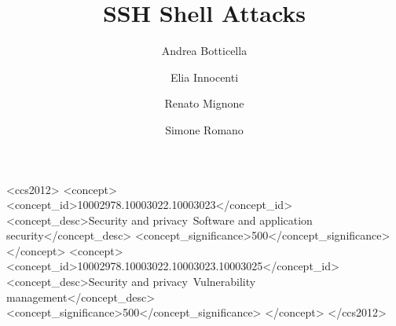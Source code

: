 \documentclass[acmlarge]{template/column-format-template/acmart}
\begin{document}
\title{SSH Shell Attacks}


\author{Andrea Botticella}

\author{Elia Innocenti}
\authornotemark[1]

\author{Renato Mignone}
\authornotemark[1]

\author{Simone Romano}
\authornotemark[1]

\renewcommand{\shortauthors}{Botticella, Innocenti, Mignone, and Romano}

\begin{CCSXML}
<ccs2012>
   <concept>
       <concept_id>10002978.10003022.10003023</concept_id>
       <concept_desc>Security and privacy~Software and application security</concept_desc>
       <concept_significance>500</concept_significance>
       </concept>
   <concept>
       <concept_id>10002978.10003022.10003023.10003025</concept_id>
       <concept_desc>Security and privacy~Vulnerability management</concept_desc>
       <concept_significance>500</concept_significance>
       </concept>
</ccs2012>
\end{CCSXML}





\maketitle

\tableofcontents                      %
\end{document}
